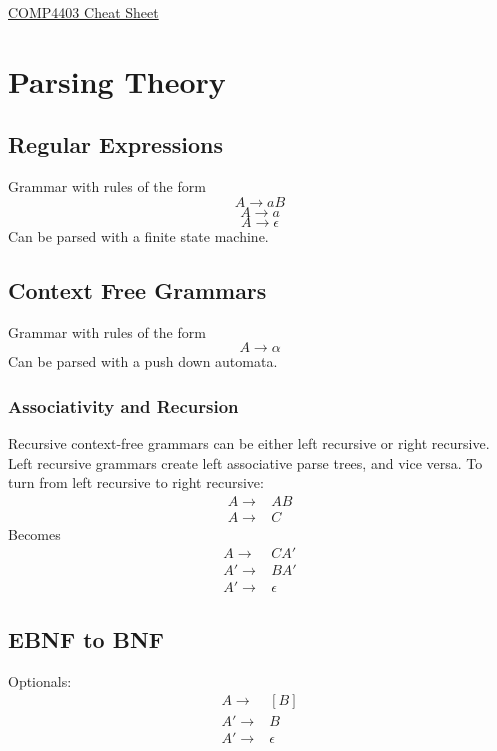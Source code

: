 \documentclass[landscape]{cheat}
\begin{document}
\footnotesize
\begin{multicols}{3}

\begin{center}
\Large{\underline{COMP4403 Cheat Sheet}} \\
\end{center}

\section{Parsing Theory}
\subsection{Regular Expressions}
Grammar with rules of the form
\[ A \rightarrow aB \]
\[ A \rightarrow a \]
\[ A \rightarrow \epsilon \]
Can be parsed with a finite state machine.

\subsection{Context Free Grammars}
Grammar with rules of the form
\[ A \rightarrow \alpha \]
Can be parsed with a push down automata.

\subsubsection{Associativity and Recursion}
Recursive context-free grammars can be either left recursive or right recursive.
Left recursive grammars create left associative parse trees, and vice versa.
To turn from left recursive to right recursive:
\begin{align*}
A \rightarrow& A B \\
A \rightarrow& C
\end{align*}
Becomes
\begin{align*}
A \rightarrow& C A' \\
A' \rightarrow& B A' \\
A' \rightarrow& \epsilon
\end{align*}

\subsection{EBNF to BNF}
Optionals:
\begin{align*}
A \rightarrow& [ B ] \\
A' \rightarrow& B \\
A' \rightarrow& \epsilon
\end{align*}


\end{multicols}
\end{document}
